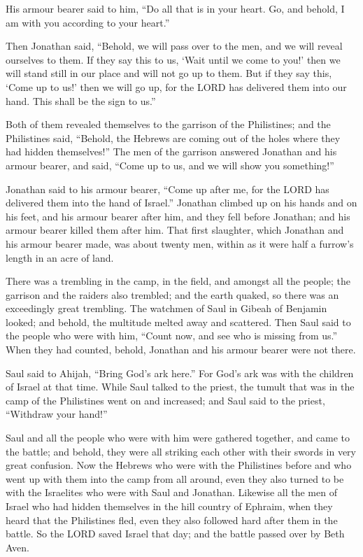  His armour bearer said to him, ``Do all that is in your
heart. Go, and behold, I am with you according to your heart.''

 Then Jonathan said, ``Behold, we will pass over to the
men, and we will reveal ourselves to them.  If they say
this to us, `Wait until we come to you!' then we will stand still in our
place and will not go up to them.  But if they say this,
`Come up to us!' then we will go up, for the LORD has delivered them
into our hand. This shall be the sign to us.''

 Both of them revealed themselves to the garrison of the
Philistines; and the Philistines said, ``Behold, the Hebrews are coming
out of the holes where they had hidden themselves!''  The
men of the garrison answered Jonathan and his armour bearer, and said,
``Come up to us, and we will show you something!''

Jonathan said to his armour bearer, ``Come up after me, for the LORD has
delivered them into the hand of Israel.''  Jonathan
climbed up on his hands and on his feet, and his armour bearer after
him, and they fell before Jonathan; and his armour bearer killed them
after him.  That first slaughter, which Jonathan and his
armour bearer made, was about twenty men, within as it were half a
furrow's length in an acre of land.

 There was a trembling in the camp, in the field, and
amongst all the people; the garrison and the raiders also trembled; and
the earth quaked, so there was an exceedingly great trembling.
 The watchmen of Saul in Gibeah of Benjamin looked; and
behold, the multitude melted away and scattered.  Then
Saul said to the people who were with him, ``Count now, and see who is
missing from us.'' When they had counted, behold, Jonathan and his
armour bearer were not there.

 Saul said to Ahijah, ``Bring God's ark here.'' For God's
ark was with the children of Israel at that time.  While
Saul talked to the priest, the tumult that was in the camp of the
Philistines went on and increased; and Saul said to the priest,
``Withdraw your hand!''

 Saul and all the people who were with him were gathered
together, and came to the battle; and behold, they were all striking
each other with their swords in very great confusion. 
Now the Hebrews who were with the Philistines before and who went up
with them into the camp from all around, even they also turned to be
with the Israelites who were with Saul and Jonathan. 
Likewise all the men of Israel who had hidden themselves in the hill
country of Ephraim, when they heard that the Philistines fled, even they
also followed hard after them in the battle.  So the LORD
saved Israel that day; and the battle passed over by Beth Aven.

